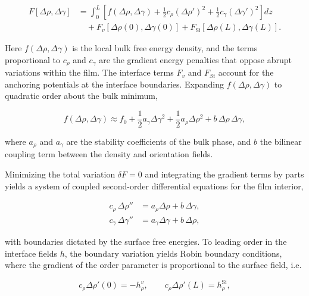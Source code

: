 \begin{equation}
  \begin{split}
  F[\Delta\rho,\Delta\gamma] &= \int_{0}^{L} \left[ f(\Delta\rho,\Delta\gamma) + \frac{1}{2}c_{\rho}\left( \Delta\rho' \right)^{2} + \frac{1}{2}c_{\gamma}\left( \Delta\gamma' \right)^{2} \right] dz \\
  &\quad + F_{v}\left[ \Delta\rho(0),\Delta\gamma(0) \right] + F_{\mathrm{Si}}\left[ \Delta\rho(L),\Delta\gamma(L) \right].
  \end{split}
  \label{eq:S-free-energy}
\end{equation}

Here \(f(\Delta\rho,\Delta\gamma)\) is the local bulk free energy density, and the terms proportional to \(c_{\rho}\) and \(c_{\gamma}\) are the gradient energy penalties that oppose abrupt variations within the film. The interface terms \(F_{v}\) and \(F_{Si}\) account for the anchoring potentials at the interface boundaries. Expanding \(f(\Delta\rho,\Delta\gamma)\) to quadratic order about the bulk minimum,

\begin{equation}
  f(\Delta\rho,\Delta\gamma) \approx f_{0} + \frac{1}{2}a_{\gamma}\Delta\gamma^{2} + \frac{1}{2}a_{\rho}\Delta\rho^{2} + b\,\Delta\rho\,\Delta\gamma,
  \label{eq:S-local-free-energy}
\end{equation}

where \(a_{\rho}\) and \(a_{\gamma}\) are the stability coefficients of the bulk phase, and \(b\) the bilinear coupling term between the density and orientation fields.

Minimizing the total variation \(\delta F = 0\) and integrating the gradient terms by parts yields a system of coupled second-order differential equations for the film interior,

\begin{align}
  c_{\rho}\,\Delta\rho'' &= a_{\rho}\Delta\rho + b\,\Delta\gamma, \label{eq:S-el-rho}\\
  c_{\gamma}\,\Delta\gamma'' &= a_{\gamma}\Delta\gamma + b\,\Delta\rho, \label{eq:S-el-gamma}
\end{align}

with boundaries dictated by the surface free energies. To leading order in the interface fields \(h\), the boundary variation yields Robin boundary conditions, where the gradient of the order parameter is proportional to the surface field, i.e.

\begin{equation}
  c_{\rho}\Delta\rho'(0) = - h_{\rho}^{v}, \qquad c_{\rho}\Delta\rho'(L) = h_{\rho}^{\mathrm{Si}},
  \label{eq:S-robin}
\end{equation}

